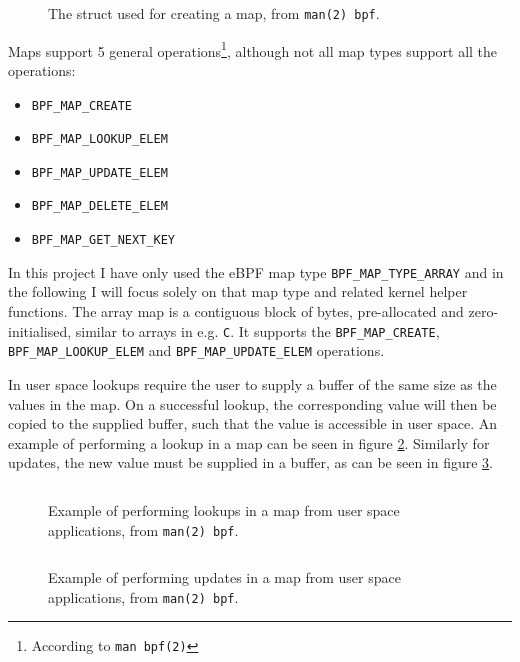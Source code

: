 \begin{figure}[htbp!]
  \centering
  \inputminted[linenos]{C}{snippets/map_struct.c}
  \caption{The struct used for creating a map, from \texttt{man(2) bpf}.}
  \label{snip:map_struct}
\end{figure}


Maps support 5 general operations\footnote{According to \texttt{man bpf(2)}}, although not all map types support all the operations:
\begin{itemize}
\item \verb!BPF_MAP_CREATE!
\item \verb!BPF_MAP_LOOKUP_ELEM!
\item \verb!BPF_MAP_UPDATE_ELEM!
\item \verb!BPF_MAP_DELETE_ELEM!
\item \verb!BPF_MAP_GET_NEXT_KEY!  
\end{itemize}

In this project I have only used the eBPF map type \verb!BPF_MAP_TYPE_ARRAY! and in the following I will focus solely on that map type and related kernel helper functions.
The array map is a contiguous block of bytes, pre-allocated and zero-initialised, similar to arrays in e.g. \verb!C!. It supports the \verb!BPF_MAP_CREATE!, \verb!BPF_MAP_LOOKUP_ELEM! and \verb!BPF_MAP_UPDATE_ELEM! operations.

In user space lookups require the user to supply a buffer of the same size as the values in the map. On a successful lookup, the corresponding value will then be copied to the supplied buffer, such that the value is accessible in user space. An example of performing a lookup in a map can be seen in figure \ref{snip:map_lookup}. Similarly for updates, the new value must be supplied in a buffer, as can be seen in figure \ref{snip:map_update}. 


\begin{figure}[htbp!]
  \centering
  \inputminted[linenos]{C}{snippets/map_lookup_struct.c}
  \caption{Example of performing lookups in a map from user space applications, from \texttt{man(2) bpf}.}
  \label{snip:map_lookup}
\end{figure}

\begin{figure}[htbp!]
  \centering
  \inputminted[linenos]{C}{snippets/map_update_struct.c}
  \caption{Example of performing updates in a map from user space applications, from \texttt{man(2) bpf}.}
  \label{snip:map_update}
\end{figure}

